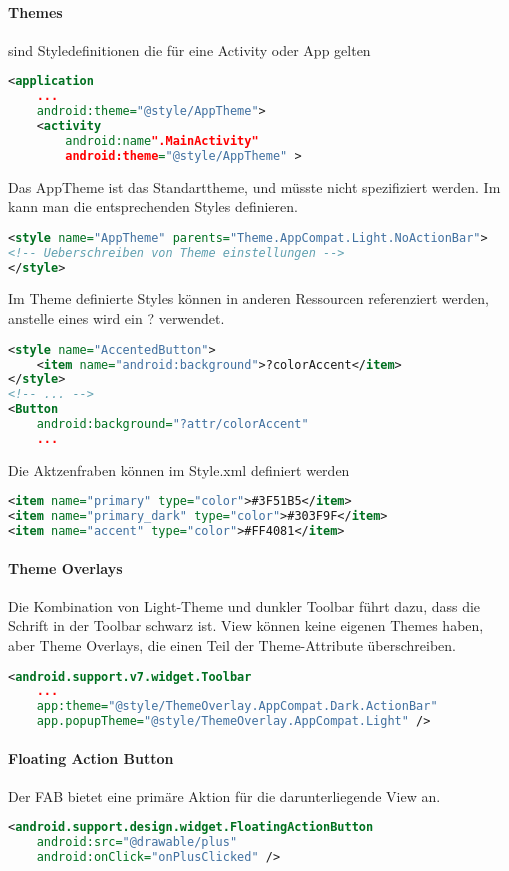 \paragraph{Themes} sind Styledefinitionen die für eine Activity oder App gelten
\begin{lstlisting}[language=xml]
<application
    ...
    android:theme="@style/AppTheme">
    <activity
        android:name".MainActivity"
        android:theme="@style/AppTheme" >
\end{lstlisting}
Das AppTheme ist das Standarttheme, und müsste nicht spezifiziert werden. Im  kann man die entsprechenden Styles definieren.
\begin{lstlisting}[language=xml]
<style name="AppTheme" parents="Theme.AppCompat.Light.NoActionBar">
<!-- Ueberschreiben von Theme einstellungen -->
</style>
\end{lstlisting}
Im Theme definierte Styles können in anderen Ressourcen referenziert werden, anstelle eines \@ wird ein ? verwendet.
\begin{lstlisting}[language=xml]
<style name="AccentedButton">
    <item name="android:background">?colorAccent</item>
</style>
<!-- ... -->
<Button
    android:background="?attr/colorAccent"
    ...
\end{lstlisting}
Die Aktzenfraben können im Style.xml definiert werden
\begin{lstlisting}[language=xml]
<item name="primary" type="color">#3F51B5</item>
<item name="primary_dark" type="color">#303F9F</item>
<item name="accent" type="color">#FF4081</item>
\end{lstlisting}
\paragraph{Theme Overlays} Die Kombination von Light-Theme und dunkler Toolbar führt dazu, dass die Schrift in der Toolbar schwarz ist. View können keine eigenen Themes haben, aber Theme Overlays, die einen Teil der Theme-Attribute überschreiben.
\begin{lstlisting}[language=xml]
<android.support.v7.widget.Toolbar
    ...
    app:theme="@style/ThemeOverlay.AppCompat.Dark.ActionBar"
    app.popupTheme="@style/ThemeOverlay.AppCompat.Light" />
\end{lstlisting}
\paragraph{Floating Action Button} Der FAB bietet eine primäre Aktion für die darunterliegende View an.
\begin{lstlisting}[language=xml]
<android.support.design.widget.FloatingActionButton
    android:src="@drawable/plus"
    android:onClick="onPlusClicked" />
\end{lstlisting}
